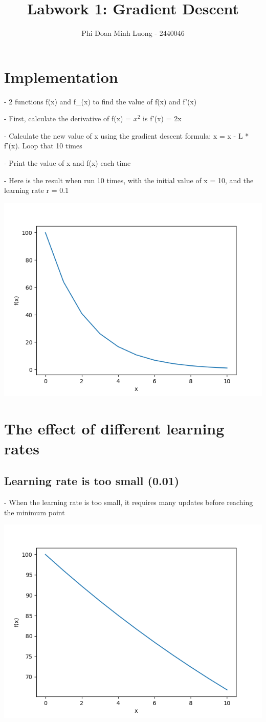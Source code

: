 \documentclass{article}
\title{Labwork 1: Gradient Descent}
\author{Phi Doan Minh Luong - 2440046}
\begin{document}
\maketitle

\setlength\parindent{0pt}

\section{Implementation}
- 2 functions f(x) and f\_(x) to find the value of f(x) and f'(x)

- First, calculate the derivative of f(x) = $x^2$ is f'(x) = 2x

- Calculate the new value of x using the gradient descent formula: x = x - L * f'(x). Loop that 10 times

- Print the value of x and f(x) each time

- Here is the result when run 10 times, with the initial value of x = 10, and the learning rate r = 0.1

\begin{center}
    \includegraphics[width=0.5\linewidth]{image1.png}
\end{center}

\section{The effect of different learning rates}
\subsection{Learning rate is too small (0.01)}
- When the learning rate is too small, it requires many updates before reaching the minimum point

\begin{center}
    \includegraphics[width=0.5\linewidth]{image2.png}
\end{center}
\end{document}
